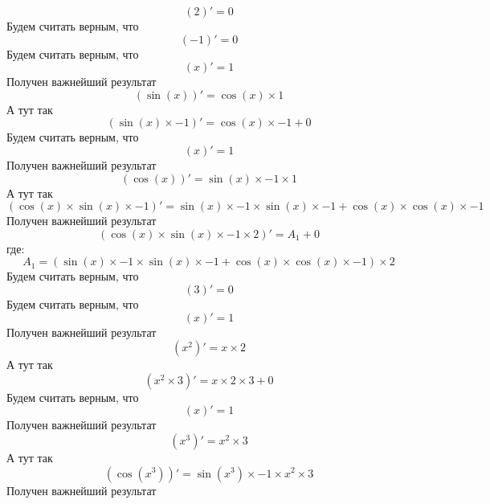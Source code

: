 \documentclass{article}
\begin{document}
\[( 2 )' =  0 \]\newline
Будем считать верным, что\newline
\[( -1 )' =  0 \]\newline
Будем считать верным, что\newline
\[( x )' =  1 \]\newline
Получен важнейший результат\newline
\[(\sin( x ))' = \cos( x )\times 1 \]\newline
А тут так\newline
\[(\sin( x )\times -1 )' = \cos( x )\times -1 + 0 \]\newline
Будем считать верным, что\newline
\[( x )' =  1 \]\newline
Получен важнейший результат\newline
\[(\cos( x ))' = \sin( x )\times -1 \times 1 \]\newline
А тут так\newline
\[(\cos( x )\times\sin( x )\times -1 )' = \sin( x )\times -1 \times\sin( x )\times -1 +\cos( x )\times\cos( x )\times -1 \]\newline
Получен важнейший результат\newline
\[(\cos( x )\times\sin( x )\times -1 \times 2 )' =  A_{1} + 0 \]\newline
где:\[A_{1} = (\sin( x )\times -1 \times\sin( x )\times -1 +\cos( x )\times\cos( x )\times -1 )\times 2 \]
Будем считать верным, что\newline
\[( 3 )' =  0 \]\newline
Будем считать верным, что\newline
\[( x )' =  1 \]\newline
Получен важнейший результат\newline
\[( x ^{ 2 })' =  x \times 2 \]\newline
А тут так\newline
\[( x ^{ 2 }\times 3 )' =  x \times 2 \times 3 + 0 \]\newline
Будем считать верным, что\newline
\[( x )' =  1 \]\newline
Получен важнейший результат\newline
\[( x ^{ 3 })' =  x ^{ 2 }\times 3 \]\newline
А тут так\newline
\[(\cos( x ^{ 3 }))' = \sin( x ^{ 3 })\times -1 \times x ^{ 2 }\times 3 \]\newline
Получен важнейший результат\newline
\end{document}
